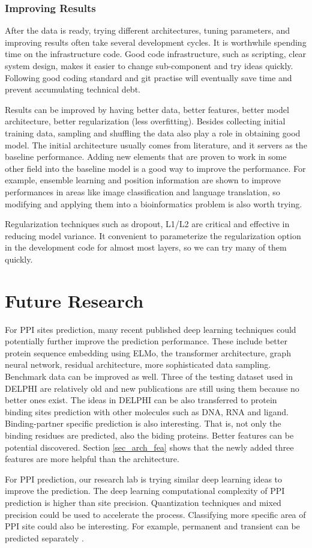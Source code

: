 \subsubsection{Improving Results}
After the data is ready, trying different architectures, tuning parameters, and improving results often take several development cycles. It is worthwhile spending time on the infrastructure code. Good code infrastructure, such as scripting, clear system design, makes it easier to change sub-component and try ideas quickly. Following good coding standard and git practise will eventually save time and prevent accumulating technical debt.

Results can be improved by having better data, better features, better model architecture, better regularization (less overfitting). Besides collecting initial training data, sampling and shuffling the data also play a role in obtaining good model. The initial architecture usually comes from literature, and it servers as the baseline performance. Adding new elements that are proven to work in some other field into the baseline model is a good way to improve the performance. For example, ensemble learning and position information are shown to improve performances in areas like image classification and language translation, so modifying and applying them into a bioinformatics problem is also worth trying.

Regularization techniques such as dropout, L1/L2 are critical and effective in reducing model variance. It convenient to parameterize the regularization option in the development code for almost most layers, so we can try many of them quickly.
\section{Future Research}
For PPI sites prediction, many recent published deep learning techniques could potentially further improve the prediction performance. These include better protein sequence embedding using ELMo, the transformer architecture, graph neural network, residual architecture, more sophisticated data sampling. Benchmark data can be improved as well. Three of the testing dataset used in DELPHI are relatively old and new publications are still using them because no better ones exist. The ideas in DELPHI can be also transferred to protein binding sites prediction with other molecules such as DNA, RNA and ligand. Binding-partner specific prediction is also interesting. That is, not only the binding residues are predicted, also the biding proteins. Better features can be potential discovered. Section \ref{sec_arch_fea} shows that the newly added three features are more helpful than the architecture. 

For PPI prediction, our research lab is trying similar deep learning ideas to improve the prediction. The deep learning computational complexity of PPI prediction is higher than site precision. Quantization techniques and mixed precision could be used to accelerate the process. Classifying more specific area of PPI site could also be interesting. For example,  permanent and transient can be predicted separately \cite{perkins2010transient}. 